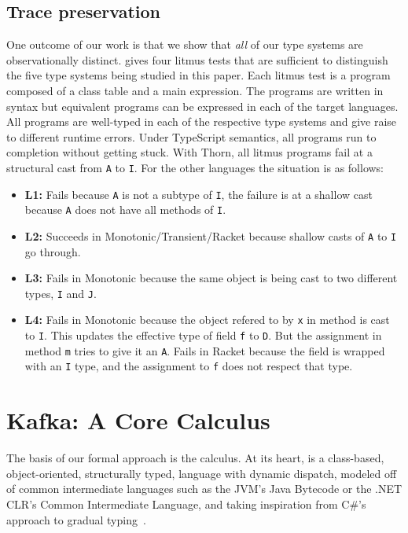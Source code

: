 \documentclass[a4paper,USenglish]{tex/lipics-v2016}
\newcommand{\code}[1]{{\tt #1}\xspace}
\begin{document}
\subsection{Trace preservation}

One outcome of our work is that we show that \emph{all} of our type systems
are observationally distinct.   gives four litmus tests that
are sufficient to distinguish the five type systems being studied in this
paper.  Each litmus test is a program composed of a class table and a main
expression. The programs are written in \kafka syntax but equivalent
programs can be expressed in each of the target languages. All programs are
well-typed in each of the respective type systems and give raise to
different runtime errors. Under TypeScript semantics, all programs run to
completion without getting stuck. With Thorn, all litmus programs fail at a structural cast from \code A to \code I.  For the other languages the situation is
as follows:
\begin{itemize}
\item {\bf L1:} Fails because \code A is not a subtype of \code I, the
  failure is at a shallow cast because \code A does not have all methods of
  \code I.
\item{\bf L2:} Succeeds in Monotonic/Transient/Racket because shallow casts
  of \code A to \code I go through.
\item{\bf L3:} Fails in Monotonic because the same object is being cast to
  two different types, \code I and \code J.
\item{\bf L4:} Fails in Monotonic because the object refered to by \code x
  in method \s is cast to \code I. This updates the effective type of field
  \code f to \code D. But the assignment in method \code m tries to give it
  an \code A. Fails in Racket because the \this field is wrapped with an
  \code I type, and the assignment to \code f does not respect that type.
\end{itemize}



\section{Kafka: A Core Calculus}

The basis of our formal approach is the \kafka calculus. At its heart,
\kafka is a class-based, object-oriented, structurally typed, language with
dynamic dispatch, modeled off of common intermediate languages such as the
JVM's Java Bytecode or the .NET CLR's Common Intermediate Language, and
taking inspiration from C\#'s approach to gradual typing~\cite{Bierman10}.
\end{document}

